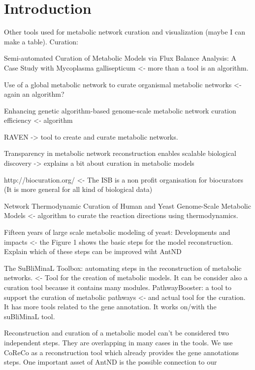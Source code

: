 \section{Introduction}

Other tools used for metabolic network curation and visualization (maybe I can make a table).
Curation: 

Semi-automated Curation of Metabolic Models via Flux Balance Analysis: A Case Study with Mycoplasma gallisepticum <- more than a tool is an algorithm.

Use of a global metabolic network to curate organismal metabolic networks <- again an algorithm?

Enhancing genetic algorithm-based genome-scale metabolic network curation efficiency <- algorithm

RAVEN -> tool to create and curate metabolic networks.

Transparency in metabolic network reconstruction enables scalable biological discovery -> explains a bit about curation in metabolic models

http://biocuration.org/ <- The ISB is a non profit organisation for biocurators (It is more general for all kind of biological data)

Network Thermodynamic Curation of Human and Yeast Genome-Scale Metabolic Models <- algorithm to curate the reaction directions using thermodynamics.

Fifteen years of large scale metabolic modeling of yeast: Developments and impacts <- the Figure 1 shows the basic steps for the model reconstruction. Explain which of these steps can be improved wiht AntND

The SuBliMinaL Toolbox: automating steps in the reconstruction of metabolic networks. <- Tool for the creation of metabolic models. It can be consider also a curation tool because it contains many modules.
PathwayBooster: a tool to support the curation of metabolic pathways <- and actual tool for the curation. It has more tools related to the gene annotation. It works on/with the suBliMinaL tool.

Reconstruction and curation of a metabolic model can't be considered two independent steps. They are overlapping in many cases in the tools. We use CoReCo as a reconstruction tool which already provides the gene annotations steps. 
One important asset of AntND is the possible connection to our 
